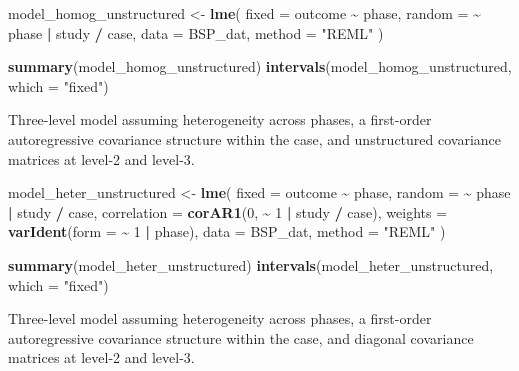 \documentclass[
]{book}
\newenvironment{Shaded}{\begin{snugshade}}{\end{snugshade}}
\newcommand{\AttributeTok}[1]{\textcolor[rgb]{0.13,0.29,0.53}{#1}}
\newcommand{\DecValTok}[1]{\textcolor[rgb]{0.00,0.00,0.81}{#1}}
\newcommand{\FunctionTok}[1]{\textcolor[rgb]{0.13,0.29,0.53}{\textbf{#1}}}
\newcommand{\NormalTok}[1]{#1}
\newcommand{\OtherTok}[1]{\textcolor[rgb]{0.56,0.35,0.01}{#1}}
\newcommand{\SpecialCharTok}[1]{\textcolor[rgb]{0.81,0.36,0.00}{\textbf{#1}}}
\newcommand{\StringTok}[1]{\textcolor[rgb]{0.31,0.60,0.02}{#1}}
\begin{document}
\begin{Shaded}
\begin{Highlighting}[]
\NormalTok{model\_homog\_unstructured }\OtherTok{\textless{}{-}} 
  \FunctionTok{lme}\NormalTok{(}
    \AttributeTok{fixed =}\NormalTok{ outcome }\SpecialCharTok{\textasciitilde{}}\NormalTok{ phase, }
    \AttributeTok{random =} \SpecialCharTok{\textasciitilde{}}\NormalTok{ phase }\SpecialCharTok{|}\NormalTok{ study }\SpecialCharTok{/}\NormalTok{ case,}
    \AttributeTok{data =}\NormalTok{ BSP\_dat,}
    \AttributeTok{method =} \StringTok{"REML"}
\NormalTok{  ) }

\FunctionTok{summary}\NormalTok{(model\_homog\_unstructured)}
\FunctionTok{intervals}\NormalTok{(model\_homog\_unstructured, }\AttributeTok{which =} \StringTok{"fixed"}\NormalTok{)}
\end{Highlighting}
\end{Shaded}

Three-level model assuming heterogeneity across phases, a first-order autoregressive covariance structure within the case, and unstructured covariance matrices at level-2 and level-3.

\begin{Shaded}
\begin{Highlighting}[]
\NormalTok{model\_heter\_unstructured }\OtherTok{\textless{}{-}} 
  \FunctionTok{lme}\NormalTok{(}
    \AttributeTok{fixed =}\NormalTok{ outcome }\SpecialCharTok{\textasciitilde{}}\NormalTok{ phase, }
    \AttributeTok{random =} \SpecialCharTok{\textasciitilde{}}\NormalTok{ phase }\SpecialCharTok{|}\NormalTok{ study }\SpecialCharTok{/}\NormalTok{ case,}
    \AttributeTok{correlation =} \FunctionTok{corAR1}\NormalTok{(}\DecValTok{0}\NormalTok{, }\SpecialCharTok{\textasciitilde{}} \DecValTok{1} \SpecialCharTok{|}\NormalTok{ study }\SpecialCharTok{/}\NormalTok{ case),}
    \AttributeTok{weights =} \FunctionTok{varIdent}\NormalTok{(}\AttributeTok{form =} \SpecialCharTok{\textasciitilde{}} \DecValTok{1} \SpecialCharTok{|}\NormalTok{ phase),}
    \AttributeTok{data =}\NormalTok{ BSP\_dat,}
    \AttributeTok{method =} \StringTok{"REML"}
\NormalTok{  ) }

\FunctionTok{summary}\NormalTok{(model\_heter\_unstructured)}
\FunctionTok{intervals}\NormalTok{(model\_heter\_unstructured, }\AttributeTok{which =} \StringTok{"fixed"}\NormalTok{)}
\end{Highlighting}
\end{Shaded}

Three-level model assuming heterogeneity across phases, a first-order autoregressive covariance structure within the case, and diagonal covariance matrices at level-2 and level-3.
\end{document}
